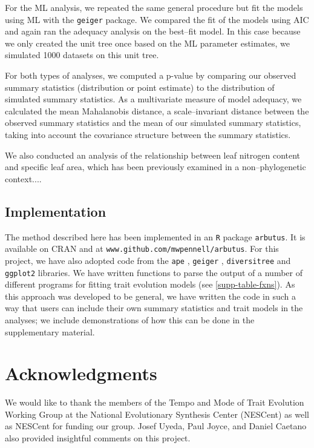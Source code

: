 \documentclass[a4paper,12pt]{article}
\begin{document}
For the ML analysis, we repeated the same general procedure but fit the models using ML with the \texttt{geiger} \citep{geiger} package. We compared the fit of the models using AIC \citep{Akaike1974} and again ran the adequacy analysis on the best--fit model. In this case because we only created the unit tree once based on the ML parameter estimates, we simulated 1000 datasets on this unit tree. 

For both types of analyses, we computed a p-value by comparing our observed summary statistics (distribution or point estimate) to the distribution of simulated summary statistics. As a multivariate measure of model adequacy, we calculated the mean Mahalanobis distance, a scale--invariant distance between the observed summary statistics and the mean of our simulated summary statistics, taking into account the covariance structure between the summary statistics.

We also conducted an analysis of the relationship between leaf nitrogen content and specific leaf area, which has been previously examined in a non--phylogenetic context....

\subsection{Implementation}

The method described here has been implemented in an \texttt{R} package \texttt{arbutus}. It is available on CRAN and at \texttt{www.github.com/mwpennell/arbutus}. For this project, we have also adopted code from the \texttt{ape} \citep{ape}, \texttt{geiger} \citep{geiger}, \texttt{diversitree} \citep{FitzJohn2012} and \texttt{ggplot2} \citep{ggplot2} libraries. We have written functions to parse the output of a number of different programs for fitting trait evolution models (see \ref{supp-table-fxns}). As this approach was developed to be general, we have written the code in such a way that users can include their own summary statistics and trait models in the analyses; we include demonstrations of how this can be done in the supplementary material.

\section{Acknowledgments}
We would like to thank the members of the Tempo and Mode of Trait Evolution Working Group at the National Evolutionary Synthesis Center (NESCent) as well as NESCent for funding our group. Josef Uyeda, Paul Joyce, and Daniel Caetano also provided insightful comments on this project.

\newpage


\end{document}
